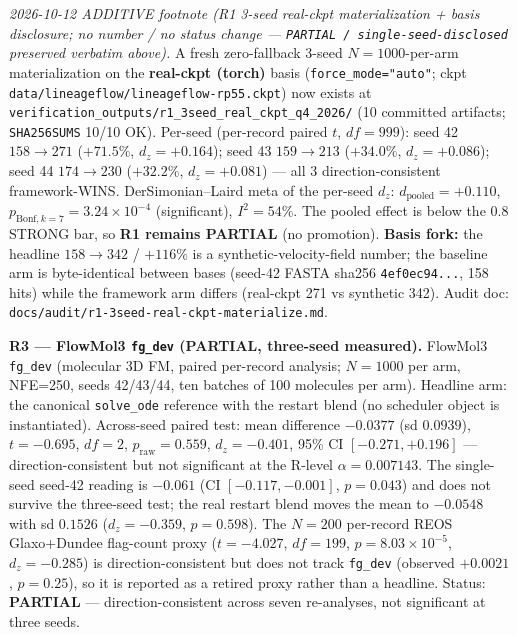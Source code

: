 \documentclass[journal,twocolumn,final]{IEEEtran}
\begin{document}
{\sloppy
\textit{2026-10-12 ADDITIVE footnote (R1 3-seed real-ckpt materialization + basis disclosure; no number / no status change --- \texttt{PARTIAL / single-seed-disclosed} preserved verbatim above).} A fresh zero-fallback 3-seed $N = 1000$-per-arm materialization on the \textbf{real-ckpt (torch)} basis (\texttt{force\_mode="auto"}; ckpt \texttt{data/lineageflow/lineageflow-rp55.ckpt}) now exists at \texttt{verification\_outputs/\allowbreak r1\_3seed\_real\_ckpt\_q4\_2026/} (10 committed artifacts; \texttt{SHA256SUMS} 10/10 OK). Per-seed (per-record paired $t$, $df = 999$): seed 42 $158 \rightarrow 271$ ($+71.5\%$, $d_z = +0.164$); seed 43 $159 \rightarrow 213$ ($+34.0\%$, $d_z = +0.086$); seed 44 $174 \rightarrow 230$ ($+32.2\%$, $d_z = +0.081$) --- all 3 direction-consistent framework-WINS. DerSimonian--Laird meta of the per-seed $d_z$: $d_\text{pooled} = +0.110$, $p_{\text{Bonf},k=7} = 3.24 \times 10^{-4}$ (significant), $I^2 = 54\%$. The pooled effect is below the $0.8$ STRONG bar, so \textbf{R1 remains PARTIAL} (no promotion). \textbf{Basis fork:} the headline $158 \rightarrow 342$ / $+116\%$ is a synthetic-velocity-field number; the baseline arm is byte-identical between bases (seed-42 FASTA sha256 \texttt{4ef0ec94...}, 158 hits) while the framework arm differs (real-ckpt 271 vs synthetic 342). Audit doc: \texttt{docs/audit/\allowbreak r1-3seed-real-ckpt-materialize.md}.
\par}

\textbf{R3 --- FlowMol3 \texttt{fg\_dev} (PARTIAL, three-seed measured).} FlowMol3 \texttt{fg\_dev} (molecular 3D FM, paired per-record analysis; $N=1000$ per arm, NFE=250, seeds 42/43/44, ten batches of 100 molecules per arm). Headline arm: the canonical \texttt{solve\_ode} reference with the restart blend (no scheduler object is instantiated). Across-seed paired test: mean difference $-0.0377$ (sd $0.0939$), $t=-0.695$, $df=2$, $p_\text{raw}=0.559$, $d_z=-0.401$, 95\% CI $[-0.271,+0.196]$ --- direction-consistent but not significant at the R-level $\alpha=0.007143$. The single-seed seed-42 reading is $-0.061$ (CI $[-0.117,-0.001]$, $p=0.043$) and does not survive the three-seed test; the real restart blend moves the mean to $-0.0548$ with sd $0.1526$ ($d_z=-0.359$, $p=0.598$). The $N=200$ per-record REOS Glaxo+Dundee flag-count proxy ($t=-4.027$, $df=199$, $p=8.03\times10^{-5}$, $d_z=-0.285$) is direction-consistent but does not track \texttt{fg\_dev} (observed $+0.0021$, $p=0.25$), so it is reported as a retired proxy rather than a headline. Status: \textbf{PARTIAL} --- direction-consistent across seven re-analyses, not significant at three seeds.
\end{document}
